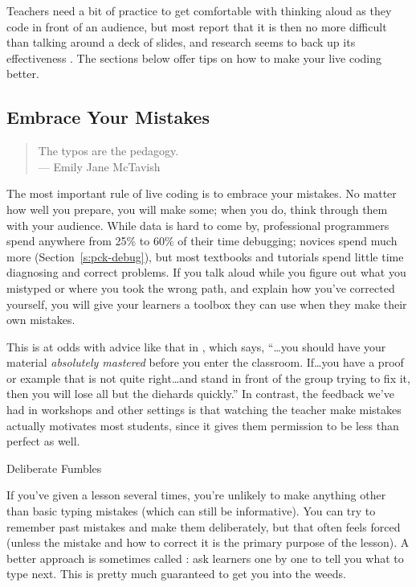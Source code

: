 Teachers need a bit of practice to get comfortable with thinking aloud
as they code in front of an audience, but most report that it is then no
more difficult than talking around a deck of slides, and research seems
to back up its effectiveness \cite{Rubi2013,Haar2017}. The sections
below offer tips on how to make your live coding better.

\subsection*{Embrace Your Mistakes}

\begin{quote}

  The typos are the pedagogy. \\
  --- Emily Jane McTavish

\end{quote}

The most important rule of live coding is to embrace your mistakes. No
matter how well you prepare, you will make some; when you do, think
through them with your audience. While data is hard to come by,
professional programmers spend anywhere from 25\% to 60\% of their time
debugging; novices spend much more (Section~\ref{s:pck-debug}), but most
textbooks and tutorials spend little time diagnosing and correct
problems. If you talk aloud while you figure out what you mistyped or
where you took the wrong path, and explain how you've corrected
yourself, you will give your learners a toolbox they can use when they
make their own mistakes.

This is at odds with advice like that in \cite{Kran2015}, which
says, ``{\ldots}you should have your material \emph{absolutely mastered} before
you enter the classroom. If{\ldots}you have a proof or example that is not
quite right{\ldots}and stand in front of the group trying to fix it, then
you will lose all but the diehards quickly.'' In contrast, the feedback
we've had in  workshops and other settings is
that watching the teacher make mistakes actually motivates most
students, since it gives them permission to be less than perfect as
well.

\begin{aside}{Deliberate Fumbles}

If you've given a lesson several times, you're unlikely to make
anything other than basic typing mistakes (which can still be
informative). You can try to remember past mistakes and make them
deliberately, but that often feels forced (unless the mistake and
how to correct it is the primary purpose of the lesson). A better
approach is sometimes called : ask
learners one by one to tell you what to type next. This is pretty
much guaranteed to get you into the weeds.

\end{aside}

